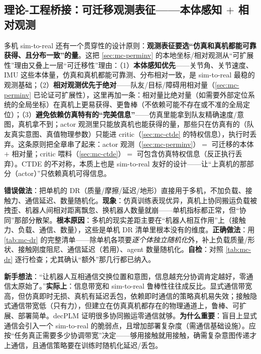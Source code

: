 \subsection{理论-工程桥接：可迁移观测表征——本体感知 $+$ 相对观测}
\label{sec:mc-transfer-obs}

多机 sim-to-real 还有一个贯穿性的设计原则：\textbf{观测表征要选“仿真和真机都能可靠获得、且分布一致”的量}。这把 \cref{sec:mc-perminv} 的本地坐标/相对观测从“可扩展性”理由又叠上一层“可迁移性”理由：（1）\textbf{本体感知优先}——关节角、关节速度、IMU 这些本体量，仿真和真机都能可靠测、分布相对一致，是 sim-to-real 最稳的观测基础；（2）\textbf{相对观测优先于绝对}——队友/目标/障碍用相对量（\cref{sec:mc-perminv} 已论证可扩展性），这里再加一条：相对量比绝对量（如需要外部定位系统的全局坐标）在真机上更易获得、更鲁棒（不依赖可能不存在或不准的全局定位）；（3）\textbf{避免依赖仿真特有的“完美信息”}——仿真里能拿到队友精确速度/意图，真机拿不到；actor 观测里只能放真机也能获得的量，那些只在仿真有的（队友真实意图、真值物理参数）只能进 critic（\cref{sec:mc-ctde} 的特权信息），执行时丢弃。这条原则把全章串了起来：actor 观测（\cref{sec:mc-perminv}）$=$ 可迁移的本体 $+$ 相对量；critic 喂料（\cref{sec:mc-ctde}）$=$ 可包含仿真特权信息（反正执行丢弃）。CTDE 的不对称，本质上也是 sim-to-real 友好的设计——让“上真机的那部分（actor）”只依赖真机可得信息。

\begin{pitfall}
\textbf{错误做法}：把单机的 DR（质量/摩擦/延迟/地形）直接用于多机，不加负载、接触力、通信延迟、数量随机化。\textbf{现象}：仿真训练表现优异，真机上协同搬运负载被拽歪、机器人间相对距离飘忽、换机器人数量就崩——单机指标都正常，但“协同”那部分散架。\textbf{根本原因}：多机的现实差距主要在“机器人相互作用”上（接触力、负载、通信、数量），这些是单机 DR 清单里根本没有的维度。\textbf{正确做法}：用 \cref{tab:mc-dr} 的完整清单——除单机各项要\emph{逐个体独立随机化}外，补上负载质量/形状、接触刚度阻尼、通信延迟（若用）、agent 数量随机化。\textbf{自检}：对照 \cref{tab:mc-dr} 逐行检查；尤其确认“额外”那几行都已纳入。
\end{pitfall}

\begin{pitfall}
\textbf{新手想法}：“让机器人互相通信交换位置和意图，信息越充分协调肯定越好，零通信太原始了。”\textbf{实际上}：信息带宽和 sim-to-real 鲁棒性往往成反比。显式通信带宽高，但仿真即时无损、真机有延迟丢包，依赖即时通信的策略真机易失效；接触隐式通信带宽低（只有力），但建立在仿真真机都存在的物理通道上，鲁棒、可扩展、部署简单。decPLM 证明很多协同搬运零通信就够。\textbf{为什么重要}：盲目上显式通信会引入一个 sim-to-real 的脆弱点，且增加部署复杂度（需通信基础设施）。应按“任务真正需要多少协调带宽”决定——够用接触就用接触，确需复杂意图传递才上通信，且通信策略要在训练时随机化延迟/丢包。
\end{pitfall}

